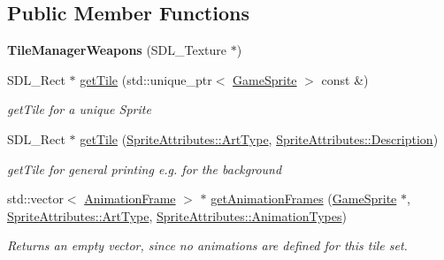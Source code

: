 \subsection*{Public Member Functions}
\begin{DoxyCompactItemize}
\item 
\mbox{\label{class_tile_manager_weapons_aff0bab701aeb812f37b88c0cb3d180f5}} 
{\bfseries Tile\+Manager\+Weapons} (S\+D\+L\+\_\+\+Texture $\ast$)
\item 
\mbox{\label{class_tile_manager_weapons_afbf96a64907bbc1d69c19dc081c997f8}} 
S\+D\+L\+\_\+\+Rect $\ast$ \mbox{\hyperlink{class_tile_manager_weapons_afbf96a64907bbc1d69c19dc081c997f8}{get\+Tile}} (std\+::unique\+\_\+ptr$<$ \mbox{\hyperlink{class_game_sprite}{Game\+Sprite}} $>$ const \&)
\begin{DoxyCompactList}\small\item\em get\+Tile for a unique Sprite \end{DoxyCompactList}\item 
\mbox{\label{class_tile_manager_weapons_a372744159940b7d869d4dbd452d690d3}} 
S\+D\+L\+\_\+\+Rect $\ast$ \mbox{\hyperlink{class_tile_manager_weapons_a372744159940b7d869d4dbd452d690d3}{get\+Tile}} (\mbox{\hyperlink{namespace_sprite_attributes_afb5447c311bc29f0ce8ddfd025c6e998}{Sprite\+Attributes\+::\+Art\+Type}}, \mbox{\hyperlink{namespace_sprite_attributes_a3ece96d6288b14d53d84e2138392395c}{Sprite\+Attributes\+::\+Description}})
\begin{DoxyCompactList}\small\item\em get\+Tile for general printing e.\+g. for the background \end{DoxyCompactList}\item 
\mbox{\label{class_tile_manager_weapons_ac68c5a47b1eabb20b0fca74fda223693}} 
std\+::vector$<$ \mbox{\hyperlink{class_animation_frame}{Animation\+Frame}} $>$ $\ast$ \mbox{\hyperlink{class_tile_manager_weapons_ac68c5a47b1eabb20b0fca74fda223693}{get\+Animation\+Frames}} (\mbox{\hyperlink{class_game_sprite}{Game\+Sprite}} $\ast$, \mbox{\hyperlink{namespace_sprite_attributes_afb5447c311bc29f0ce8ddfd025c6e998}{Sprite\+Attributes\+::\+Art\+Type}}, \mbox{\hyperlink{namespace_sprite_attributes_ae1a753cb32f500b34381aac4b197b3a7}{Sprite\+Attributes\+::\+Animation\+Types}})
\begin{DoxyCompactList}\small\item\em Returns an empty vector, since no animations are defined for this tile set. \end{DoxyCompactList}\end{DoxyCompactItemize}

